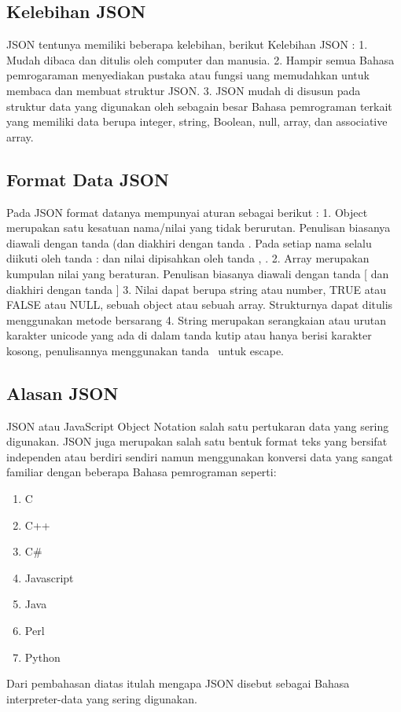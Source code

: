 \documentclass[a4paper]{article}
\begin{document}
\subsection{Kelebihan JSON}
JSON tentunya memiliki beberapa kelebihan, berikut Kelebihan JSON :
1.	Mudah dibaca dan ditulis oleh computer dan manusia.
2.	Hampir semua Bahasa pemrogaraman menyediakan pustaka atau fungsi uang memudahkan untuk membaca dan membuat struktur JSON.
3.	JSON mudah di disusun pada struktur data yang digunakan oleh sebagain besar Bahasa pemrograman terkait yang memiliki data berupa integer, string, Boolean, null, array, dan associative array.

\subsection{Format Data JSON}
Pada JSON format datanya mempunyai aturan sebagai berikut :
1. Object merupakan satu kesatuan nama/nilai yang tidak berurutan. Penulisan biasanya diawali dengan tanda { (dan diakhiri dengan tanda } .
Pada setiap nama selalu diikuti oleh tanda : dan nilai dipisahkan oleh tanda , .
2.  Array merupakan kumpulan nilai yang beraturan. Penulisan biasanya diawali dengan tanda [ dan diakhiri dengan tanda ]
3. Nilai dapat berupa string atau number, TRUE atau FALSE atau NULL, sebuah object atau sebuah array. Strukturnya dapat ditulis menggunakan metode bersarang
4. String merupakan serangkaian atau urutan karakter unicode yang ada di dalam tanda kutip atau hanya berisi karakter kosong, penulisannya menggunakan tanda \  untuk escape.

\subsection{Alasan JSON}
JSON atau JavaScript Object Notation salah satu pertukaran data yang sering digunakan. JSON juga merupakan salah satu bentuk format teks yang bersifat independen atau berdiri sendiri namun menggunakan konversi data yang sangat familiar dengan beberapa Bahasa pemrograman seperti:

\begin{enumerate}
\item C
\item C++
\item C\#
\item Javascript
\item Java
\item Perl
\item Python

\end{enumerate}
Dari pembahasan diatas itulah mengapa JSON disebut sebagai Bahasa interpreter-data yang sering digunakan.
\end{document}
